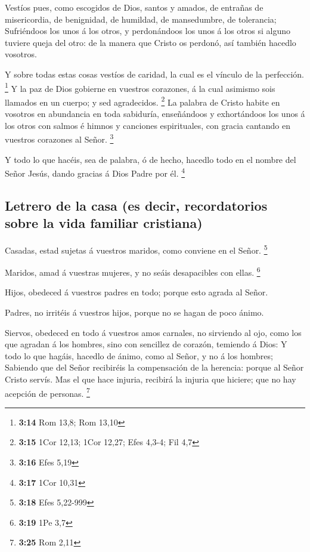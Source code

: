  Vestíos pues, como escogidos de Dios, santos y amados, de
entrañas de misericordia, de benignidad, de humildad, de mansedumbre, de
tolerancia;  Sufriéndoos los unos á los otros, y
perdonándoos los unos á los otros si alguno tuviere queja del otro: de
la manera que Cristo os perdonó, así también hacedlo vosotros.

 Y sobre todas estas cosas vestíos de caridad, la cual es
el vínculo de la perfección. \footnote{\textbf{3:14} Rom 13,8; Rom 13,10}
 Y la paz de Dios gobierne en vuestros corazones, á la cual
asimismo sois llamados en un cuerpo; y sed agradecidos. \footnote{\textbf{3:15}
  1Cor 12,13; 1Cor 12,27; Efes 4,3-4; Fil 4,7}  La palabra
de Cristo habite en vosotros en abundancia en toda sabiduría,
enseñándoos y exhortándoos los unos á los otros con salmos é himnos y
canciones espirituales, con gracia cantando en vuestros corazones al
Señor. \footnote{\textbf{3:16} Efes 5,19}

 Y todo lo que hacéis, sea de palabra, ó de hecho, hacedlo
todo en el nombre del Señor Jesús, dando gracias á Dios Padre por él.
\footnote{\textbf{3:17} 1Cor 10,31}

\hypertarget{letrero-de-la-casa-es-decir-recordatorios-sobre-la-vida-familiar-cristiana}{%
\subsection{Letrero de la casa (es decir, recordatorios sobre la vida
familiar
cristiana)}\label{letrero-de-la-casa-es-decir-recordatorios-sobre-la-vida-familiar-cristiana}}

 Casadas, estad sujetas á vuestros maridos, como conviene
en el Señor. \footnote{\textbf{3:18} Efes 5,22-999}

 Maridos, amad á vuestras mujeres, y no seáis desapacibles
con ellas. \footnote{\textbf{3:19} 1Pe 3,7}

 Hijos, obedeced á vuestros padres en todo; porque esto
agrada al Señor.

 Padres, no irritéis á vuestros hijos, porque no se hagan
de poco ánimo.

 Siervos, obedeced en todo á vuestros amos carnales, no
sirviendo al ojo, como los que agradan á los hombres, sino con sencillez
de corazón, temiendo á Dios:  Y todo lo que hagáis, hacedlo
de ánimo, como al Señor, y no á los hombres;  Sabiendo que
del Señor recibiréis la compensación de la herencia: porque al Señor
Cristo servís.  Mas el que hace injuria, recibirá la
injuria que hiciere; que no hay acepción de personas. \footnote{\textbf{3:25}
  Rom 2,11}

